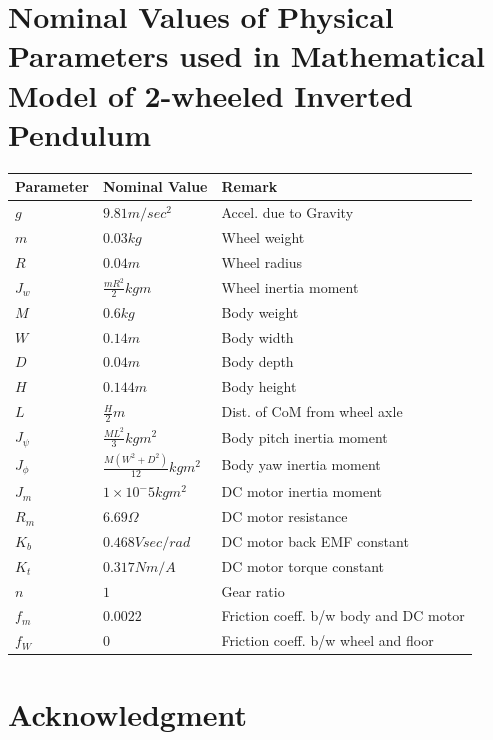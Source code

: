 \documentclass[a4paper,10pt]{article}
\begin{document}
\section{Nominal Values of Physical Parameters used in Mathematical Model of 2-wheeled Inverted Pendulum}
\begin{tabular}{|l|l|l|}
\hline
Parameter & Nominal Value & Remark \\
\hline
$g$ & $9.81 m/sec^2$ & Accel. due to Gravity \\
\hline
$m$ & $0.03 kg$ & Wheel weight \\
\hline
$R$ & $0.04 m$ & Wheel radius \\
\hline
$J_{w}$ & $\frac{mR^2}{2} kgm$ & Wheel inertia moment \\
\hline
$M$ & $0.6 kg$ & Body weight \\
\hline
$W$ & $0.14 m$ & Body width \\
\hline
$D$ & $0.04 m$ & Body depth \\
\hline
$H$ & $0.144 m$ & Body height \\
\hline
$L$ & $\frac{H}{2} m$  & Dist. of CoM from wheel axle \\
\hline
$J_{\psi}$ & $\frac{ML^2}{3} kgm^2$ & Body pitch inertia moment \\
\hline
$J_{\phi}$ & $\frac{M(W^2+D^2)}{12} kgm^2$ & Body yaw inertia moment \\
\hline
$J_m$ & $1×10^−5 kgm^2$ & DC motor inertia moment \\
\hline
$R_m$ & $6.69 \Omega$ & DC motor resistance \\
\hline
$K_b$ & $0.468 Vsec/rad$ & DC motor back EMF constant \\
\hline
$K_t$ & $0.317 Nm/A$ & DC motor torque constant \\
\hline
$n$ & $1$ & Gear ratio \\
\hline
$f_m$ & $0.0022$ & Friction coeff. b/w body and DC motor \\
\hline
$f_W$ & $0$ & Friction coeff. b/w wheel and floor \\
\hline
\end{tabular}



\section*{Acknowledgment}
\end{document}
